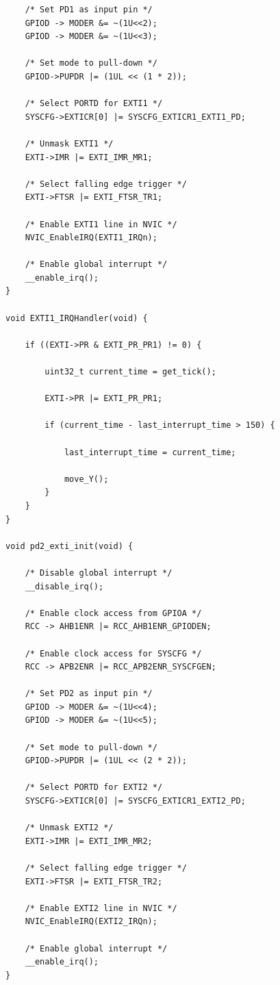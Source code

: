 \documentclass[12pt]{article}
\numberwithin{subsubsubsection}{subsubsection}
\begin{document}
\begin{verbatim}
    /* Set PD1 as input pin */
    GPIOD -> MODER &= ~(1U<<2);
    GPIOD -> MODER &= ~(1U<<3);
    
    /* Set mode to pull-down */
    GPIOD->PUPDR |= (1UL << (1 * 2));
    
    /* Select PORTD for EXTI1 */
    SYSCFG->EXTICR[0] |= SYSCFG_EXTICR1_EXTI1_PD;
    
    /* Unmask EXTI1 */
    EXTI->IMR |= EXTI_IMR_MR1;
    
    /* Select falling edge trigger */
    EXTI->FTSR |= EXTI_FTSR_TR1;
    
    /* Enable EXTI1 line in NVIC */
    NVIC_EnableIRQ(EXTI1_IRQn);
    
    /* Enable global interrupt */
    __enable_irq();
}

void EXTI1_IRQHandler(void) {

    if ((EXTI->PR & EXTI_PR_PR1) != 0) {
    
        uint32_t current_time = get_tick();
    
        EXTI->PR |= EXTI_PR_PR1;
    
        if (current_time - last_interrupt_time > 150) {
    
            last_interrupt_time = current_time;
    
            move_Y();
        }
    }
}

void pd2_exti_init(void) {

    /* Disable global interrupt */
    __disable_irq();
    
    /* Enable clock access from GPIOA */
    RCC -> AHB1ENR |= RCC_AHB1ENR_GPIODEN;
    
    /* Enable clock access for SYSCFG */
    RCC -> APB2ENR |= RCC_APB2ENR_SYSCFGEN;
    
    /* Set PD2 as input pin */
    GPIOD -> MODER &= ~(1U<<4);
    GPIOD -> MODER &= ~(1U<<5);
    
    /* Set mode to pull-down */
    GPIOD->PUPDR |= (1UL << (2 * 2));
    
    /* Select PORTD for EXTI2 */
    SYSCFG->EXTICR[0] |= SYSCFG_EXTICR1_EXTI2_PD;
    
    /* Unmask EXTI2 */
    EXTI->IMR |= EXTI_IMR_MR2;
    
    /* Select falling edge trigger */
    EXTI->FTSR |= EXTI_FTSR_TR2;
    
    /* Enable EXTI2 line in NVIC */
    NVIC_EnableIRQ(EXTI2_IRQn);
    
    /* Enable global interrupt */
    __enable_irq();
}


\end{verbatim}
\end{document}
